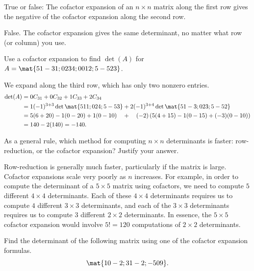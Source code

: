 \begin{problems}
\problem %
  True or false: The cofactor expansion of an $n \times n$ matrix along the
  first row gives the negative of the cofactor expansion along the second row.
  
  \begin{solution}
    False.  The cofactor expansion gives the same determinant, no matter what
    row (or column) you use.
  \end{solution}

\problem %
Use a cofactor expansion to find $\det(A)$ for 
$A =  \mat{5 1 -3 1; 0 2 3 4; 0 0 1 2; 5 -5 2 3}$.

\begin{solution}
We expand along the third row, which has only two nonzero entries.
\begin{align*}
  \det(A) & = 0 C_{31} + 0 C_{32} + 1 C_{33} + 2 C_{34} \\
          & = 1(-1)^{3+3} \det\mat{5 1 1; 0 2 4; 5 -5 3} +
            2(-1)^{3+4} \det \mat{5 1 -3; 0 2 3; 5 -5 2} \\
          & = 5(6+20)-1(0-20)+1(0-10) \quad + \quad
            (-2)\left(5(4+15)-1(0-15) +(-3)(0-10)\right) \\
          & = 140 - 2(140) = -140.
\end{align*}
\end{solution}

\problem %
As a general rule, which method for computing $n \times n$ determinants is
faster: row-reduction, or the cofactor expansion?  Justify your answer.

\begin{solution}
  Row-reduction is generally much faster, particularly if the matrix is large.
  Cofactor expansions scale very poorly as $n$ increases.  For example, in order
  to compute the determinant of a $5 \times 5$ matrix using cofactors, we need
  to compute $5$ different $4 \times 4$ determinants.  Each of these
  $4 \times 4$ determinants requires us to compute $4$ different $3 \times 3$
  determinants, and each of the $3 \times 3$ determinants requires us to compute
  $3$ different $2 \times 2$ determinants.  In essence, the $5 \times 5$
  cofactor expansion would involve $5! = 120$ computations of $2 \times 2$
  determinants.  
\end{solution}

\problem %
Find the determinant of the following matrix using one of the cofactor expansion formulas.
\[\mat{1 0 -2; 3 1 -2; -5 0 9}.\]


\end{problems}
